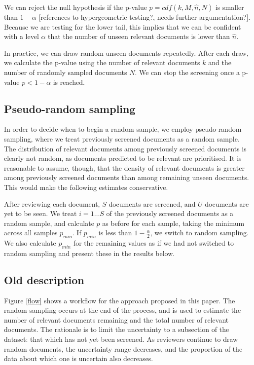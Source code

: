 \documentclass{bmcart}
\begin{document}
	We can reject the null hypothesis if the p-value $p = cdf(k,M,\hat{n},N)$ is smaller than $1 - \alpha$ [references to hypergeometric testing?, needs further argumentation?]. Because we are testing for the lower tail, this implies that we can be confident with a level $\alpha$ that the number of unseen relevant documents is lower than $\hat{n}$.
	
	In practice, we can draw random unseen documents repeatedly. After each draw, we calculate the p-value using the number of relevant documents $k$ and the number of randomly sampled documents $N$.
	We can stop the screening once a p-value $p < 1 - \alpha$ is reached.


	\subsection*{Pseudo-random sampling}
	In order to decide when to begin a random sample, we employ pseudo-random sampling, where we treat previously screened documents as a random sample. The distribution of relevant documents among previously screened documents is clearly not random, as documents predicted to be relevant are prioritised. It is reasonable to assume, though, that the density of relevant documents is greater among previously screened documents than among remaining unseen documents. This would make the following estimates conservative. 
	
	After reviewing each document, $S$ documents are screened, and $U$ documents are yet to be seen. We treat $i = 1 \dots S$ of the previously screened documents as a random sample, and calculate $p$ as before for each sample, taking the minimum across all samples $p_{min}$. If $p_{min}$ is less than $1-\frac{\alpha}{2}$, we switch to random sampling. We also calculate $p_{min}$ for the remaining values as if we had not switched to random sampling and present these in the results below.


	\medskip
	
	\subsection*{Old description}


	Figure \ref{flow} shows a workflow for the approach proposed in this paper. 
	The random sampling occurs at the end of the process, and is used to estimate the number of relevant documents remaining and the total number of relevant documents. 
	The rationale is to limit the uncertainty to a subsection of the dataset: that which has not yet been screened. 
	As reviewers continue to draw random documents, the uncertainty range decreases, and the proportion of the data about which one is uncertain also decreases.
	
\end{document}
